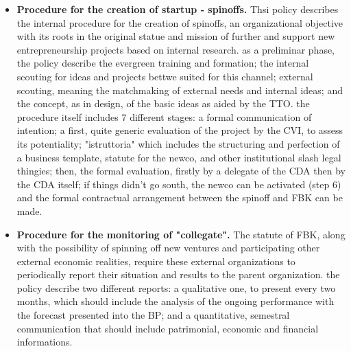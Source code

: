 \begin{itemize}
\item \textbf{Procedure for the creation of startup - spinoffs.} Thsi policy describes the internal procedure for the creation of spinoffs, an organizational objective with its roots in the original statue and mission of further and support new entrepreneurship projects based on internal research. as a preliminar phase, the policy describe the evergreen training and formation; the internal scouting for ideas and projects bettwe suited for this channel; external scouting, meaning the matchmaking of external needs and internal ideas; and the concept, as in design, of the basic ideas as aided by the TTO. the procedure itself includes 7 different stages: a formal communication of intention; a first, quite generic evaluation of the project by the CVI, to assess its potentiality; "istruttoria" which includes the structuring and perfection of a business template, statute for the newco, and other institutional slash legal thingies; then, the formal evaluation, firstly by a delegate of the CDA then by the CDA itself; if things didn't go south, the newco can be activated (step 6) and the formal contractual arrangement between the spinoff and FBK can be made.

\item \textbf{Procedure for the monitoring of "collegate".} The statute of FBK, along with the possibility of spinning off new ventures and participating other external economic realities, require these external organizations to periodically report their situation and results to the parent organization. the policy describe two different reports: a qualitative one, to present every two months, which should include the analysis of the ongoing performance with the forecast presented into the BP; and a quantitative, semestral communication that should include patrimonial, economic and financial informations.

\end{itemize} 
